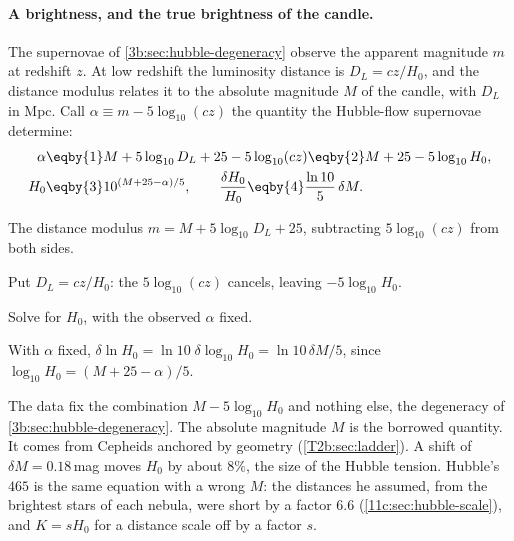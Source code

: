 \paragraph{A brightness, and the true brightness of the candle.} The supernovae of
\cref{3b:sec:hubble-degeneracy} observe the apparent magnitude $m$ at redshift $z$. At low
redshift the luminosity distance is $D_L=cz/H_0$, and the distance modulus relates it to
the absolute magnitude $M$ of the candle, with $D_L$ in Mpc. Call
$\alpha\equiv m-5\log_{10}(cz)$ the quantity the Hubble-flow supernovae determine:
\begin{align}
  \alpha
  &\eqby{1}M+5\log_{10}D_L+25-5\log_{10}(cz)
   \eqby{2}M+25-5\log_{10}H_0,\nonumber\\
  H_0
  &\eqby{3}10^{(M+25-\alpha)/5},\qquad
  \frac{\delta H_0}{H_0}\eqby{4}\frac{\ln10}{5}\,\delta M .
  \label{11c:eq:h0-candle}
\end{align}
\begin{explain}
  \item The distance modulus $m=M+5\log_{10}D_L+25$, subtracting $5\log_{10}(cz)$ from both sides.
  \item Put $D_L=cz/H_0$: the $5\log_{10}(cz)$ cancels, leaving $-5\log_{10}H_0$.
  \item Solve for $H_0$, with the observed $\alpha$ fixed.
  \item With $\alpha$ fixed, $\delta\ln H_0=\ln10\;\delta\log_{10}H_0=\ln10\,\delta M/5$, since
        $\log_{10}H_0=(M+25-\alpha)/5$.
\end{explain}
The data fix the combination $M-5\log_{10}H_0$ and nothing else, the degeneracy of
\cref{3b:sec:hubble-degeneracy}. The absolute magnitude $M$ is the borrowed quantity. It
comes from Cepheids anchored by geometry (\cref{T2b:sec:ladder}). A shift of $\delta M=0.18$\,mag
moves $H_0$ by about $8\%$, the size of the Hubble tension. Hubble's $465$ is the
same equation with a wrong $M$: the distances he assumed, from the brightest stars of
each nebula, were short by a factor $6.6$ (\cref{11c:sec:hubble-scale}), and $K=sH_0$ for a
distance scale off by a factor $s$.

